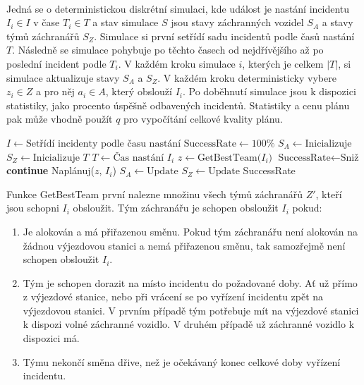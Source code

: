 \\
Jedná se o deterministickou diskrétní simulaci, kde událost je nastání incidentu $I_i \in I$ v čase $T_i \in T$ a stav simulace $S$
jsou stavy záchranných vozidel $S_A$ a stavy týmů záchranářů $S_Z$.
Simulace si první setřídí sadu incidentů podle časů nastání $T$.
Následně se simulace pohybuje po těchto časech od nejdřívějšího až po poslední incident podle $T_i$.
V každém kroku simulace $i$, kterých je celkem $|T|$, si simulace aktualizuje stavy $S_A$ a $S_Z$.
V každém kroku deterministicky vybere $z_i \in Z$ a pro něj $a_i \in A$, který obslouží $I_i$. 
Po doběhnutí simulace jsou k dispozici statistiky, jako procento úspěšně odbavených incidentů.
Statistiky a cenu plánu pak může vhodně použít $q$ pro vypočítání celkové kvality plánu.

\clearpage

\begin{algorithmic}[1]  %
	\State $I \gets \mbox{Setřídí incidenty podle času nastání}$
	\State $\text{SuccessRate} \gets 100\%$
	\State $S_A \gets \mbox{Inicializuje}$
	\State $S_Z \gets \mbox{Inicializuje}$
  \State $T$ 
    \State $T \gets \mbox{Čas nastání $I_i$}$
    \State $z \gets \mbox{GetBestTeam($I_i$)}$
      \State $\text{SuccessRate} \gets \mbox{Sniž}$
      \State \textbf{continue}
    \EndIf
    \State Naplánuj($z$, $I_i$)
    \State $S_A \gets \mbox{Update}$
    \State $S_Z \gets \mbox{Update}$
  \EndFor
  \State \Return SuccessRate
\EndFunction
\end{algorithmic}

\vspace*{25px}

Funkce GetBestTeam první nalezne množinu všech týmů záchranářů $Z'$, kteří jsou schopni $I_i$ obsloužit.
Tým záchranářu je schopen obsloužit $I_i$ pokud:

\begin{enumerate}
  \item Je alokován a má přiřazenou směnu. Pokud tým záchranářu není alokován na žádnou výjezdovou stanici a nemá přiřazenou směnu, tak samozřejmě není schopen obsloužit $I_i$.
  \item Tým je schopen dorazit na místo incidentu do požadované doby. Ať už přímo z výjezdové stanice, nebo při vrácení se po vyřízení incidentu zpět na výjezdovou stanici. 
    V prvním případě tým potřebuje mít na výjezdové stanici k dispozi volné záchranné vozidlo. V druhém případě už záchranné vozidlo k dispozici má.
  \item Týmu nekončí směna dřive, než je očekávaný konec celkové doby vyřízení incidentu.
\end{enumerate}

